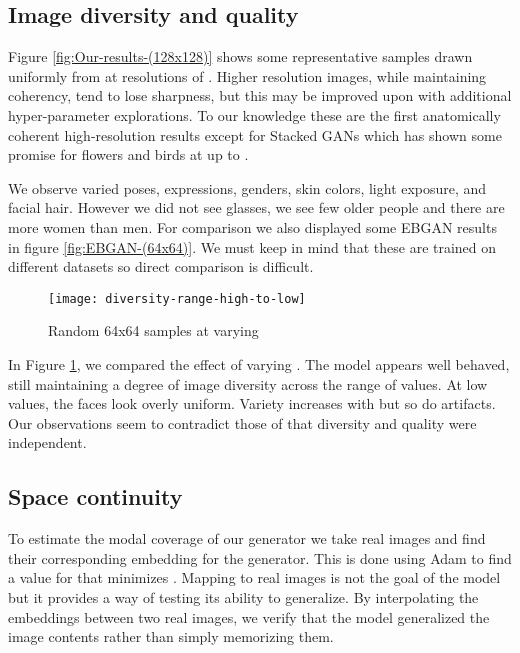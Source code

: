 \documentclass[english]{article}
\begin{document}
\subsection{Image diversity and quality}

Figure \ref{fig:Our-results-(128x128)} shows some representative
samples drawn uniformly from  at resolutions of .
Higher resolution images, while maintaining coherency, tend to lose
sharpness, but this may be improved upon with additional hyper-parameter
explorations. To our knowledge these are the first anatomically coherent
high-resolution results except for Stacked GANs \cite{zhang2016stackgan}
which has shown some promise for flowers and birds at up to . 

We observe varied poses, expressions, genders, skin colors, light
exposure, and facial hair. However we did not see glasses, we see
few older people and there are more women than men. For comparison
we also displayed some EBGAN \cite{zhao2016energy_ebgan} results
in figure \ref{fig:EBGAN-(64x64)}. We must keep in mind that these
are trained on different datasets so direct comparison is difficult.

\begin{figure}
\centering{}\texttt{[image: diversity-range-high-to-low]}\caption{Random 64x64 samples at varying \label{fig:randvar}}
\end{figure}


In Figure \ref{fig:randvar}, we compared the effect of varying .
The model appears well behaved, still maintaining a degree of image
diversity across the range of values. At low values, the faces look
overly uniform. Variety increases with  but so do artifacts.
Our observations seem to contradict those of \cite{poole2016improved}
that diversity and quality were independent.


\subsection{Space continuity}

To estimate the modal coverage of our generator we take real images
and find their corresponding  embedding for the generator.
This is done using Adam to find a value for  that minimizes
. Mapping to real images is not the goal
of the model but it provides a way of testing its ability to generalize.
By interpolating the  embeddings between two real images,
we verify that the model generalized the image contents rather than
simply memorizing them.
\end{document}
